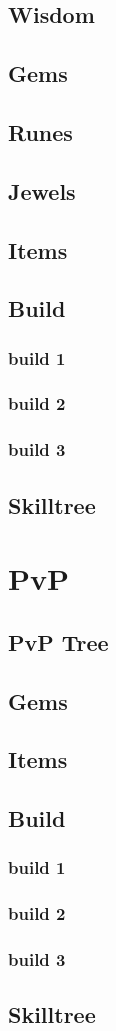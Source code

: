 \documentclass[12pt]{article}
\begin{document}
\subsection{Wisdom}
\subsection{Gems}
\subsection{Runes}
\subsection{Jewels}
\subsection{Items}
\subsection{Build}
\subsubsection{build 1}
\subsubsection{build 2}
\subsubsection{build 3}
\subsection{Skilltree}

\newpage

\section{PvP}
\subsection{PvP Tree}
\subsection{Gems}
\subsection{Items}
\subsection{Build}
\subsubsection{build 1}
\subsubsection{build 2}
\subsubsection{build 3}
\subsection{Skilltree}

\newpage
\end{document}
